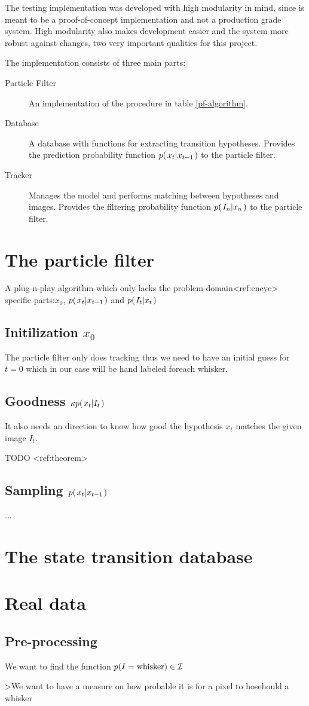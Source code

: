 The testing implementation was developed with high modularity in mind, since is meant to be a proof-of-concept implementation and not a production grade system. High modularity also makes development easier and the system more robust against changes, two very important qualities for this project.


The implementation consists of three main parts:
\begin{description}
  \item[Particle Filter] An implementation of the procedure in table \ref{pf-algorithm}.
  \item[Database] A database with functions for extracting transition hypotheses. Provides the prediction probability function $p{(\left. x_t \middle\vert x_{t-1} \right.)}$ to the particle filter.
  \item[Tracker] Manages the model and performs matching between hypotheses and images. Provides the filtering probability function $p{(\left. I_n \middle\vert x_n \right.)}$ to the particle filter.
\end{description}




\section{The particle filter}
    A plug-n-play algorithm which only lacks the problem-domain<ref:encyc> specific parts:$x_0$, $p{(\left. x_t \middle\vert x_{t-1} \right.)}$ and $p{(\left. I_t \middle\vert x_t \right.)}$
    \subsection{Initilization $x_0$}
        The particle filter only does tracking thus we need to have an initial guess for $t=0$ which in our case will be hand labeled foreach whisker.
    \subsection{Goodness $\kappa p{(\left. x_t \middle\vert I_t \right.)}$}
        It also needs an direction to know how good the hypothesis $x_t$ matches the given image $I_t$.

        TODO <ref:theorem>
    \subsection{Sampling $p{(\left. x_t \middle\vert x_{t-1} \right.)}$}

        ...

\section{The state transition database}





\section{Real data}
    \subsection{Pre-processing}

    We want to find the function $p{(I=\text{whisker})}\in\mathcal{I}$

    >We want to have a measure on how probable it is for a pixel to hosehould a whisker





